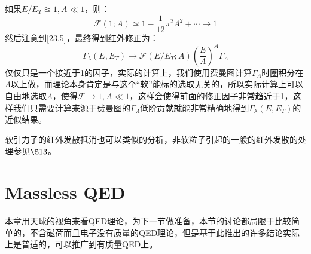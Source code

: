 如果$E/E_T\approxeq 1,A\ll 1$，则：
\begin{equation}
	\mathscr{F}\left(1;A\right)\simeq1-\frac{1}{12}\pi^2A^2+\cdots \to1
\end{equation}
然后注意到\ref{23.5}，最终得到红外修正为：
\begin{equation}
	\Gamma_{\lambda}(E,E_{T})\to\mathscr{F}\left(E/E_{T};A\right)\left(\frac{E}{\Lambda}\right)^{A}\Gamma_{\Lambda}
\end{equation}
仅仅只是一个接近于1的因子，实际的计算上，我们使用费曼图计算$\Gamma_{\Lambda}$时圈积分在$\Lambda$以上做，而理论本身肯定是与这个“软”能标的选取无关的，所以实际计算上可以自由地选取$\Lambda$，使得$\mathscr{F}\to1,A\ll 1$，这样会使得前面的修正因子非常趋近于1，这样我们只需要计算来源于费曼图的$\Gamma_{\Lambda}$低阶贡献就能非常精确地得到$\Gamma_{\lambda}(E,E_{T})$的近似结果。

软引力子的红外发散抵消也可以类似的分析\cite{PhysRev.140.B516}，非软粒子引起的一般的红外发散的处理参见\cite{Weinberg}$\S 13$。
\section{Massless QED}
本章用天球的视角来看QED理论，为下一节做准备，本节的讨论都局限于比较简单的，不含磁荷而且电子没有质量的QED理论，但是基于此推出的许多结论实际上是普适的，可以推广到有质量QED上\cite{Strominger:2017zoo}。
